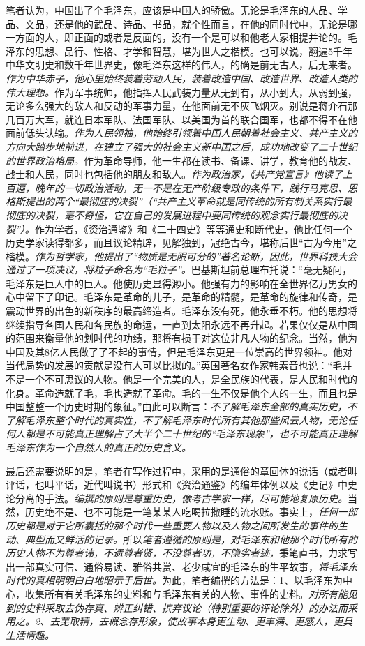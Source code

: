 \documentclass[../../dazhuan.tex]{subfiles}
\begin{document}
笔者认为，中国出了个毛泽东，应该是中国人的骄傲。无论是毛泽东的人品、学品、文品，还是他的武品、诗品、书品，就个性而言，在他的同时代中，无论是哪一方面的人，即正面的或者是反面的，没有一个是可以和他老人家相提并论的。毛泽东的思想、品行、性格、才学和智慧，堪为世人之楷模。也可以说，翻遍5千年中华文明史和数千年世界史，像毛泽东这样的伟人，的确是前无古人，后无来者。\emph{作为中华赤子，他心里始终装着劳动人民，装着改造中国、改造世界、改造人类的伟大理想。}作为军事统帅，他指挥人民武装力量从无到有，从小到大，从弱到强，无论多么强大的敌人和反动的军事力量，在他面前无不灰飞烟灭。别说是蒋介石那几百万大军，就连日本军队、法国军队、以美国为首的联合国军，也都不得不在他面前低头认输。\emph{作为人民领袖，他始终引领着中国人民朝着社会主义、共产主义的方向大踏步地前进，在建立了强大的社会主义新中国之后，成功地改变了二十世纪的世界政治格局。}作为革命导师，他一生都在读书、备课、讲学，教育他的战友、战士和人民，同时也包括他的朋友和敌人。\emph{作为政治家，《共产党宣言》他读了上百遍，晚年的一切政治活动，无一不是在无产阶级专政的条件下，践行马克思、恩格斯提出的两个“最彻底的决裂”（“共产主义革命就是同传统的所有制关系实行最彻底的决裂，毫不奇怪，它在自己的发展进程中要同传统的观念实行最彻底的决裂”）。}作为学者，《资治通鉴》和《二十四史》等等通史和断代史，他比任何一个历史学家读得都多，而且议论精辟，见解独到，冠绝古今，堪称后世“古为今用”之楷模。\emph{作为哲学家，他提出了“物质是无限可分的”著名论断，因此，世界科技大会通过了一项决议，将粒子命名为“毛粒子”。}巴基斯坦前总理布托说：“毫无疑问，毛泽东是巨人中的巨人。他使历史显得渺小。他强有力的影响在全世界亿万男女的心中留下了印记。毛泽东是革命的儿子，是革命的精髓，是革命的旋律和传奇，是震动世界的出色的新秩序的最高缔造者。毛泽东没有死，他永垂不朽。他的思想将继续指导各国人民和各民族的命运，一直到太阳永远不再升起。若果仅仅是从中国的范围来衡量他的划时代的功绩，那将有损于对这位非凡人物的纪念。当然，他为中国及其8亿人民做了了不起的事情，但是毛泽东更是一位崇高的世界领袖。他对当代局势的发展的贡献是没有人可以比拟的。”英国著名女作家韩素音也说：“毛并不是一个不可思议的人物。他是一个完美的人，是全民族的代表，是人民和时代的化身。革命造就了毛，毛也造就了革命。毛的一生不仅是他个人的一生，而且也是中国整整一个历史时期的象征。”由此可以断言：\emph{不了解毛泽东全部的真实历史，不了解毛泽东整个时代的真实性，不了解毛泽东时代所有其他那些风云人物，无论任何人都是不可能真正理解占了大半个二十世纪的“毛泽东现象”，也不可能真正理解毛泽东作为一个自然人的真正的历史含义。}

最后还需要说明的是，笔者在写作过程中，采用的是通俗的章回体的说话（或者叫评话，也叫平话，近代叫说书）形式和《资治通鉴》的编年体例以及《史记》中史论分离的手法。\emph{编撰的原则是尊重历史，像考古学家一样，尽可能地复原历史。}当然，历史绝不是、也不可能是一笔某某人吃喝拉撒睡的流水账。事实上，\emph{任何一部历史都是对于它所囊括的那个时代一些重要人物以及人物之间所发生的事件的生动、典型而又鲜活的记录。}所以\emph{笔者遵循的原则是，对毛泽东和他那个时代所有的历史人物不为尊者讳，不遗尊者贤，不没尊者功，不隐劣者迹，}秉笔直书，力求写出一部真实可信、通俗易读、雅俗共赏、老少咸宜的毛泽东的生平故事，\emph{将毛泽东时代的真相明明白白地昭示于后世。}为此，笔者编撰的方法是：1、以毛泽东为中心，收集所有有关毛泽东的史料和与毛泽东有关的人物、事件的史料。\emph{对所有能见到的史料采取去伪存真、辨正纠错、摈弃议论（特别重要的评论除外）的办法而采用之。2、去芜取精，去概念存形象，使故事本身更生动、更丰满、更感人，更具生活情趣。}
\end{document}

